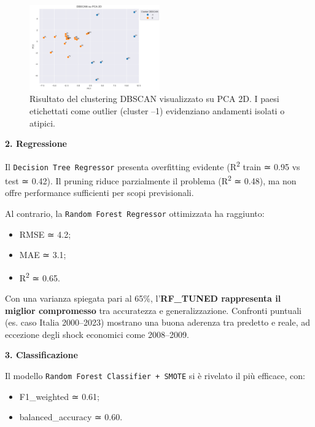 \documentclass[conference]{IEEEtran}
\begin{document}
\begin{figure}[H]
\centering
\includegraphics[width=0.5\textwidth]{DBSCAN.png}
\caption{Risultato del clustering DBSCAN visualizzato su PCA 2D. I paesi etichettati come outlier (cluster –1) evidenziano andamenti isolati o atipici.}
\label{fig:dbscan-pca}
\end{figure}

\vspace{1em}\noindent\textbf{2. Regressione}

Il \texttt{Decision Tree Regressor} presenta overfitting evidente (R\textsuperscript{2} train ≃ 0.95 vs test ≃ 0.42). Il pruning riduce parzialmente il problema (R\textsuperscript{2} ≃ 0.48), ma non offre performance sufficienti per scopi previsionali.

Al contrario, la \texttt{Random Forest Regressor} ottimizzata ha raggiunto:

\begin{itemize}
  \item RMSE ≃ 4.2;
  \item MAE ≃ 3.1;
  \item R\textsuperscript{2} ≃ 0.65.
\end{itemize}

Con una varianza spiegata pari al 65\%, l’\textbf{RF\_TUNED rappresenta il miglior compromesso} tra accuratezza e generalizzazione. Confronti puntuali (es. caso Italia 2000–2023) mostrano una buona aderenza tra predetto e reale, ad eccezione degli shock economici come 2008–2009.

\vspace{1em}\noindent\textbf{3. Classificazione}

Il modello \texttt{Random Forest Classifier + SMOTE} si è rivelato il più efficace, con:

\begin{itemize}
  \item F1\_weighted ≃ 0.61;
  \item balanced\_accuracy ≃ 0.60.
\end{itemize}
\end{document}
